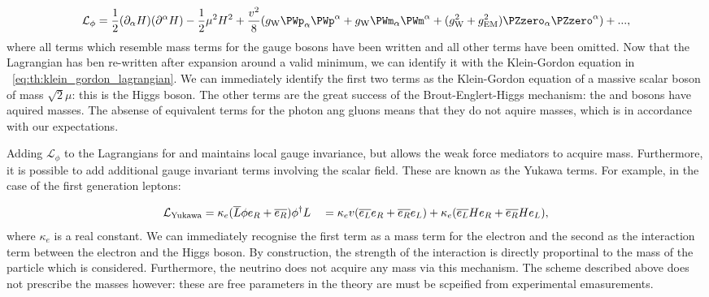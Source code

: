 \begin{equation}
\label{eq:th:higgs_lagrangian}
\mathcal{L}_{\phi} = \frac{1}{2} (\partial_{\alpha} H) (\partial^{\alpha} H) - \frac{1}{2} \mu^{2} H^2 + \frac{v^2}{8}( g_{\textrm{W}} \PWp_{\alpha}\PWp^{\alpha} + g_{\textrm{W}} \PWm_{\alpha}\PWm^{\alpha} + (g^2_{\textrm{W}}+g^2_{\textrm{EM}}) \PZzero_{\alpha}\PZzero^{\alpha}) + ...,
\end{equation}
where all terms which resemble mass terms for the gauge bosons have been written and all other terms have been omitted.
Now that the Lagrangian has ben re-written after expansion around a valid minimum, we can identify it with the Klein-Gordon equation in \Eq~\ref{eq:th:klein_gordon_lagrangian}. We can immediately identify the first two terms as the Klein-Gordon equation of a massive scalar boson of mass $\sqrt{2}\mu$: this is the Higgs boson. The other terms are the great success of the Brout-Englert-Higgs mechanism: the \PWpm and \PZzero bosons have aquired masses. The absense of equivalent terms for the photon ang gluons means that they do not aquire masses, which is in accordance with our expectations.

Adding $\mathcal{L}_{\phi}$ to the \SM Lagrangians for \EWT and \QCD maintains local gauge invariance, but allows the weak force mediators to acquire mass. Furthermore, it is possible to add additional gauge invariant terms involving the scalar field. These are known as the Yukawa terms. For example, in the case of the first generation leptons:

\begin{equation}
\label{eq:th:yukawa_coupling}
\mathcal{L}_{\textrm{Yukawa}}= \kappa_{e} (\overline{L} \phi  e_{R} + \overline{e_{R}}) \phi^{\dagger} L \\
                      \quad  =  \kappa_{e} v (\overline{e_{L}} e_{R} + \overline{e_{R}} e_{L} ) +  \kappa_{e}   (\overline{e_{L}} H e_{R} + \overline{e_{R}} H e_{L} ),
\end{equation}
where $\kappa_{e}$ is a real constant. We can immediately recognise the first term as a mass term for the electron and the second as the interaction term between the electron and the Higgs boson. By construction, the strength of the interaction is directly proportinal to the mass of the particle which is considered. Furthermore, the neutrino does not acquire any mass via this mechanism. The scheme described above does not prescribe the masses however: these are free parameters in the theory are must be scpeified from experimental emasurements.


